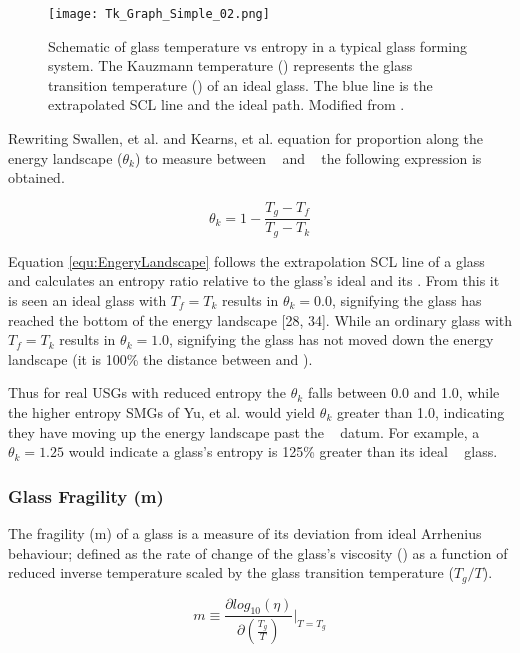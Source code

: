 \documentclass[a4paper,12pt,oneside]{report}%
\begin{document}
\begin{figure}[htbp]
	\centering
	\texttt{[image: Tk\_Graph\_Simple\_02.png]}
	\caption{Schematic of glass temperature vs entropy in a typical glass forming system. The Kauzmann temperature (\Tk) represents the glass transition temperature (\Tg) of an ideal glass. The blue line is the extrapolated SCL line and the ideal path. Modified from \cite{Kearns2008}.}
	\label{fig:TkGraph}
\end{figure}

Rewriting Swallen, et al. \cite{Swallen2007} and Kearns, et al. \cite{Kearns2008} equation for proportion along the energy landscape ($\theta_{k}$) to measure between \Tk~ and \Tg~ the following expression is obtained. 

\begin{equation}
\theta_{k} = 1 - \frac{T_{g}-T_{f}}{T_{g}-T_{k}}
\label{equ:EngeryLandscape}
\end{equation}

Equation \ref{equ:EngeryLandscape} follows the extrapolation SCL line of a glass and calculates an entropy ratio relative to the glass's ideal \Tk and its \Tg. From this it is seen an ideal glass with $T_{f}=T_{k}$ results in $\theta_{k}=0.0$, signifying the glass has reached the bottom of the energy landscape [28, 34]. While an ordinary glass with  $T_{f}=T_{k}$ results in $\theta_{k}=1.0$, signifying the glass has not moved down the energy landscape (it is 100\% the distance between \Tk and \Tg).

Thus for real USGs with reduced entropy the $\theta_{k}$ falls between 0.0 and 1.0, while the higher entropy  SMGs of Yu, et al. \cite{Yu2013} would yield $\theta_{k}$ greater than 1.0, indicating they have moving up the energy landscape past the \Tg~ datum. For example, a $\theta_{k}=1.25$ would indicate a glass's entropy is 125\% greater than its ideal \Tk~ glass.

\subsubsection{Glass Fragility (m)}
The fragility (m)  of a glass is a measure of its deviation from ideal Arrhenius behaviour; defined as the rate of change of the glass's viscosity (\n) as a function of reduced inverse temperature scaled by the glass transition temperature ($T_{g}/T$).

\begin{equation}
m \equiv 
\frac{\partial log_{10} (\eta)}
{\partial (\frac{T_{g}} {T})}
\biggr|_{T=T_{g}}
\label{equ:Fragility}
\end{equation}
\end{document}
